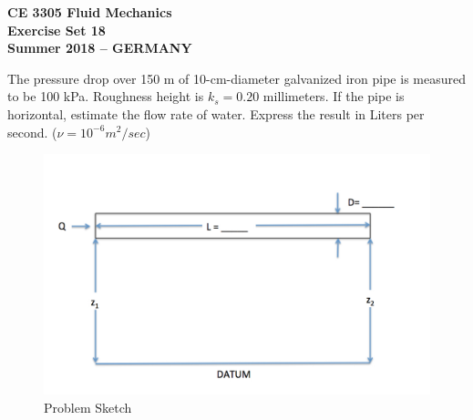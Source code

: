 \documentclass[12pt]{article}
\begin{document}
\begingroup
\begin{center}
{\textbf{{ CE 3305 Fluid Mechanics} \\ Exercise Set 18 \\ Summer 2018 -- GERMANY } }
\end{center}
\endgroup

 The pressure drop over 150 m of 10-cm-diameter galvanized iron pipe is measured to be 100 kPa.  
Roughness height is $k_s = 0.2 0$ millimeters.  
If the pipe is horizontal, estimate the flow rate of water.  
Express the result in Liters per second.  ($\nu = 10^{-6} m^2/sec$)

\begin{figure}[h!] %
   \centering
   \includegraphics[width=5in]{PipelineSketch.jpg} 
   \caption{Problem Sketch}
   \label{fig:PipelineSketch}
\end{figure}
\end{document}
